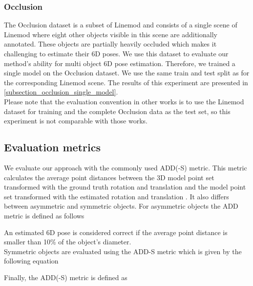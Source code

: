 \documentclass[twocolumn, 10pt, letterpaper]{article}
\begin{document}
\subsubsection{Occlusion}
\label{subsubsection_occlusion}
The Occlusion dataset is a subset of Linemod and consists of a single scene of Linemod where eight other objects visible in this scene are additionally annotated. These objects are partially heavily occluded which makes it challenging to estimate their 6D poses. We use this dataset to evaluate our method's ability for multi object 6D pose estimation. Therefore, we trained a single model on the Occlusion dataset. We use the same train and test split as for the corresponding Linemod scene. The results of this experiment are presented in \autoref{subsection_occlusion_single_model}.\\
Please note that the evaluation convention in other works \cite{PoseCNN}\cite{PVNet} is to use the Linemod dataset for training and the complete Occlusion data as the test set, so this experiment is not comparable with those works.

\subsection{Evaluation metrics}
\label{subsection_evaluation_metrics}
We evaluate our approach with the commonly used ADD(-S) metric\cite{ADD}. This metric calculates the average point distances between the 3D model point set  transformed with the ground truth rotation  and translation  and the model point set transformed with the estimated rotation  and translation . It also differs between asymmetric and symmetric objects. For asymmetric objects the ADD metric is defined as follows

An estimated 6D pose is considered correct if the average point distance is smaller than 10\% of the object's diameter.\\
Symmetric objects are evaluated using the ADD-S metric which is given by the following equation

Finally, the ADD(-S) metric is defined as 
\end{document}
